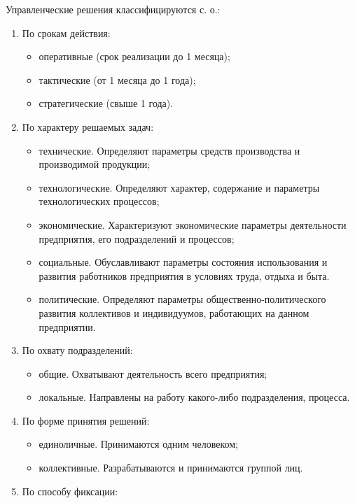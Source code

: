 \documentclass[12pt, russian, oneside, article]{ncc}
\begin{document}
Управленческие решения классифицируются с. о.:
\begin{enumerate}
\item По срокам действия:

\begin{itemize}
\item оперативные (срок реализации до 1 месяца);
\item тактические (от 1 месяца до 1 года);
\item стратегические (свыше 1 года).
\end{itemize}

\item По характеру решаемых задач:

\begin{itemize}
\item технические. Определяют параметры средств производства и производимой продукции;
\item технологические. Определяют характер, содержание и параметры технологических процессов;
\item экономические. Характеризуют экономические параметры деятельности предприятия, его подразделений и процессов;
\item социальные. Обуславливают параметры состояния использования и развития работников предприятия в условиях труда, отдыха и быта.
\item политические. Определяют параметры общественно-политического развития коллективов и индивидуумов, работающих на данном предприятии.
\end{itemize}

\item По охвату подразделений:

\begin{itemize}
\item общие. Охватывают деятельность всего предприятия;
\item локальные. Направлены на работу какого-либо подразделения, процесса.
\end{itemize}

\item По форме принятия решений:

\begin{itemize}
\item единоличные. Принимаются одним человеком;
\item коллективные. Разрабатываются и принимаются группой лиц.
\end{itemize}

\item По способу фиксации:


\end{enumerate}
\end{document}
